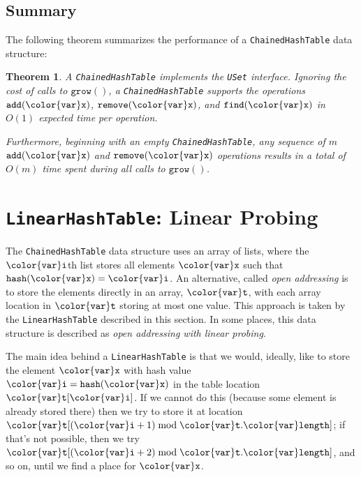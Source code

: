 \documentclass[10pt]{book}
\newcommand{\seclabel}[1]{\label{sec:#1}}
\theoremstyle{plain}
\newtheorem{thm}{Theorem}[chapter]
\newcommand{\thmlabel}[1]{\label{thm:#1}}
\theoremstyle{definition}
\begin{document}
\subsection{Summary}

The following theorem summarizes the performance of a \texttt{ChainedHashTable}
data structure:

\begin{thm}\thmlabel{hashtable}
  A \texttt{ChainedHashTable} implements the \texttt{USet} interface.  Ignoring the cost of
  calls to \ensuremath{\mathtt{grow()}}, a \texttt{ChainedHashTable} supports the operations \ensuremath{\mathtt{add({\color{var}x})}},
  \ensuremath{\mathtt{remove({\color{var}x})}}, and \ensuremath{\mathtt{find({\color{var}x})}} in $O(1)$ expected time per operation.

  Furthermore, beginning with an empty \texttt{ChainedHashTable}, any sequence of
  $m$ \ensuremath{\mathtt{add({\color{var}x})}} and \ensuremath{\mathtt{remove({\color{var}x})}} operations results in a total of $O(m)$
  time spent during all calls to \ensuremath{\mathtt{grow()}}.
\end{thm}

\section{\texttt{LinearHashTable}: Linear Probing}
\seclabel{linearhashtable}

%
The \texttt{ChainedHashTable} data structure uses an array of lists, where the \ensuremath{\mathtt{{\color{var}i}}}th
list stores all elements \ensuremath{\mathtt{{\color{var}x}}} such that $\ensuremath{\mathtt{hash({\color{var}x})}}=\ensuremath{\mathtt{{\color{var}i}}}$.  An alternative,
called \emph{open addressing}
%
is to store the elements directly in an
array, \ensuremath{\mathtt{{\color{var}t}}}, with each array location in \ensuremath{\mathtt{{\color{var}t}}} storing at most one value.
This approach is taken by the \texttt{LinearHashTable} described in this
section.  In some places, this data structure is described as \emph{open
addressing with linear probing}.
%

The main idea behind a \texttt{LinearHashTable} is that we would, ideally, like
to store the element \ensuremath{\mathtt{{\color{var}x}}} with hash value \ensuremath{\mathtt{{\color{var}i}=hash({\color{var}x})}} in the table location
\ensuremath{\mathtt{{\color{var}t}[{\color{var}i}]}}.  If we cannot do this (because some element is already stored
there) then we try to store it at location $\ensuremath{\mathtt{{\color{var}t}}}[(\ensuremath{\mathtt{{\color{var}i}}}+1)\bmod\ensuremath{\mathtt{{\color{var}t}.{\color{var}length}}}]$;
if that's not possible, then we try $\ensuremath{\mathtt{{\color{var}t}}}[(\ensuremath{\mathtt{{\color{var}i}}}+2)\bmod\ensuremath{\mathtt{{\color{var}t}.{\color{var}length}}}]$,
and so on, until we find a place for \ensuremath{\mathtt{{\color{var}x}}}.
\end{document}
